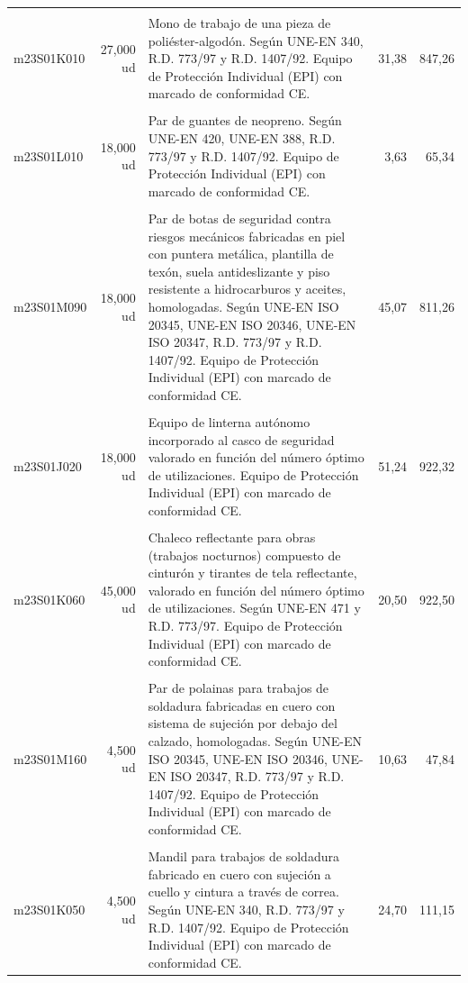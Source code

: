 \documentclass{book}%
\begin{document}
\begin{longtable}{lrlrr}
&&&&\\%
m23S01K010&    27,000 ud&\multicolumn{1}{p{5cm}}{Mono de trabajo de una pieza de poliéster{-}algodón. Según UNE{-}EN 340, R.D. 773/97 y R.D. 1407/92. Equipo de Protección Individual (EPI) con marcado de conformidad CE.}&     31,38&847,26\\%
&&&&\\%
m23S01L010&    18,000 ud&\multicolumn{1}{p{5cm}}{Par de guantes de neopreno. Según UNE{-}EN 420, UNE{-}EN 388, R.D. 773/97 y R.D. 1407/92. Equipo de Protección Individual (EPI) con marcado de conformidad CE.}&      3,63&65,34\\%
&&&&\\%
m23S01M090&    18,000 ud&\multicolumn{1}{p{5cm}}{Par de botas de seguridad contra riesgos mecánicos fabricadas en piel con puntera metálica, plantilla de texón, suela antideslizante y piso resistente a hidrocarburos y aceites, homologadas. Según UNE{-}EN ISO 20345, UNE{-}EN ISO 20346, UNE{-}EN ISO 20347, R.D. 773/97 y R.D. 1407/92. Equipo de Protección Individual (EPI) con marcado de conformidad CE.}&     45,07&811,26\\%
&&&&\\%
m23S01J020&    18,000 ud&\multicolumn{1}{p{5cm}}{Equipo de linterna autónomo incorporado al casco de seguridad valorado en función del número óptimo de utilizaciones. Equipo de Protección Individual (EPI) con marcado de conformidad CE.}&     51,24&922,32\\%
&&&&\\%
m23S01K060&    45,000 ud&\multicolumn{1}{p{5cm}}{Chaleco reflectante para obras (trabajos nocturnos) compuesto de cinturón y tirantes de tela reflectante, valorado en función del número óptimo de utilizaciones. Según UNE{-}EN 471 y R.D. 773/97. Equipo de Protección Individual (EPI) con marcado de conformidad CE.}&     20,50&922,50\\%
&&&&\\%
m23S01M160&     4,500 ud&\multicolumn{1}{p{5cm}}{Par de polainas para trabajos de soldadura fabricadas en cuero con sistema de sujeción por debajo del calzado, homologadas. Según UNE{-}EN ISO 20345, UNE{-}EN ISO 20346, UNE{-}EN ISO 20347, R.D. 773/97 y R.D. 1407/92. Equipo de Protección Individual (EPI) con marcado de conformidad CE.}&     10,63&47,84\\%
&&&&\\%
m23S01K050&     4,500 ud&\multicolumn{1}{p{5cm}}{Mandil para trabajos de soldadura fabricado en cuero con sujeción a cuello y cintura a través de correa. Según UNE{-}EN 340, R.D. 773/97 y R.D. 1407/92. Equipo de Protección Individual (EPI) con marcado de conformidad CE.}&     24,70&111,15\\%

\end{longtable}
\end{document}
